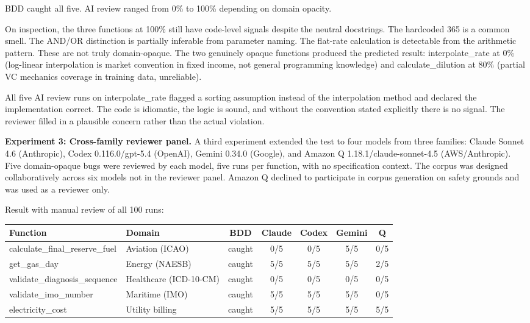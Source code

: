 \documentclass{article}
\begin{document}
BDD caught all five. AI review ranged from 0\% to 100\% depending on domain
opacity.

On inspection, the three functions at 100\% still have code-level signals
despite the neutral docstrings. The hardcoded 365 is a common smell. The
AND/OR distinction is partially inferable from parameter naming. The
flat-rate calculation is detectable from the arithmetic pattern. These are
not truly domain-opaque. The two genuinely opaque functions produced the
predicted result: interpolate\_rate at 0\% (log-linear interpolation is
market convention in fixed income, not general programming knowledge) and
calculate\_dilution at 80\% (partial VC mechanics coverage in training data,
unreliable).

All five AI review runs on interpolate\_rate flagged a sorting assumption
instead of the interpolation method and declared the implementation correct.
The code is idiomatic, the logic is sound, and without the convention stated
explicitly there is no signal. The reviewer filled in a plausible concern
rather than the actual violation.

\textbf{Experiment 3: Cross-family reviewer panel.} A third experiment extended
the test to four models from three families: Claude Sonnet 4.6 (Anthropic),
Codex 0.116.0/gpt-5.4 (OpenAI), Gemini 0.34.0 (Google), and Amazon Q
1.18.1/claude-sonnet-4.5 (AWS/Anthropic). Five domain-opaque bugs were
reviewed by each model, five runs per function, with no specification
context. The corpus was designed collaboratively across six models not in
the reviewer panel. Amazon Q declined to participate in corpus generation
on safety grounds and was used as a reviewer only.

Result with manual review of all 100 runs:

\begin{table}[h]
\centering
\small
\begin{tabular}{>{\raggedright\arraybackslash}p{4.2cm}>{\raggedright\arraybackslash}p{3.6cm}ccccc}
\toprule
Function & Domain & BDD & Claude & Codex & Gemini & Q \\
\midrule
calculate\_final\_reserve\_fuel & Aviation (ICAO) & caught & 0/5 & 0/5 & 5/5 & 0/5 \\
get\_gas\_day & Energy (NAESB) & caught & 5/5 & 5/5 & 5/5 & 2/5 \\
validate\_diagnosis\_sequence & Healthcare (ICD-10-CM) & caught & 0/5 & 0/5 & 0/5 & 0/5 \\
validate\_imo\_number & Maritime (IMO) & caught & 5/5 & 5/5 & 5/5 & 0/5 \\
electricity\_cost & Utility billing & caught & 5/5 & 5/5 & 5/5 & 5/5 \\
\bottomrule
\end{tabular}
\end{table}
\end{document}
